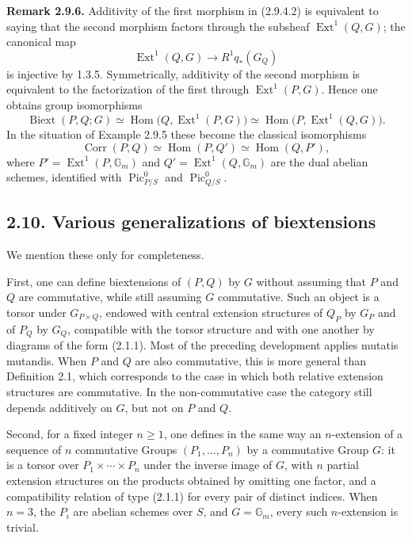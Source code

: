 \documentclass[11pt]{article}
\providecommand{\Pic}{\operatorname{Pic}}
\providecommand{\Ext}{\operatorname{Ext}}
\providecommand{\Biext}{\operatorname{Biext}}
\providecommand{\Corr}{\operatorname{Corr}}
\begin{document}
\textbf{Remark 2.9.6.}  Additivity of the first morphism in (2.9.4.2) is equivalent to saying that the second morphism factors through the subsheaf \(\Ext^1(Q,G)\); the canonical map
\begin{equation}\tag{2.9.6.0}
  \Ext^1(Q,G)\longrightarrow R^1q_*(G_Q)
\end{equation}
is injective by 1.3.5.  Symmetrically, additivity of the second morphism is equivalent to the factorization of the first through \(\Ext^1(P,G)\).  Hence one obtains group isomorphisms
\begin{equation}\tag{2.9.6.1}
  \Biext(P,Q;G)
  \simeq \operatorname{Hom}\bigl(Q,\Ext^1(P,G)\bigr)
  \simeq \operatorname{Hom}\bigl(P,\Ext^1(Q,G)\bigr).
\end{equation}
In the situation of Example 2.9.5 these become the classical isomorphisms
\begin{equation}\tag{2.9.6.2}
  \Corr(P,Q)\simeq \operatorname{Hom}(P,Q')\simeq\operatorname{Hom}(Q,P'),
\end{equation}
where \(P'=\Ext^1(P,\mathbb G_m)\) and \(Q'=\Ext^1(Q,\mathbb G_m)\) are the dual abelian schemes, identified with \(\Pic^0_{P/S}\) and \(\Pic^0_{Q/S}\).

\subsection*{2.10. Various generalizations of biextensions}
We mention these only for completeness.

First, one can define biextensions of \((P,Q)\) by \(G\) without assuming that \(P\) and \(Q\) are commutative, while still assuming \(G\) commutative.  Such an object is a torsor under \(G_{P\times Q}\), endowed with central extension structures of \(Q_P\) by \(G_P\) and of \(P_Q\) by \(G_Q\), compatible with the torsor structure and with one another by diagrams of the form (2.1.1).  Most of the preceding development applies mutatis mutandis.  When \(P\) and \(Q\) are also commutative, this is more general than Definition 2.1, which corresponds to the case in which both relative extension structures are commutative.  In the non-commutative case the category still depends additively on \(G\), but not on \(P\) and \(Q\).

Second, for a fixed integer \(n\geq1\), one defines in the same way an \(n\)-extension of a sequence of \(n\) commutative Groups \((P_1,\ldots,P_n)\) by a commutative Group \(G\): it is a torsor over \(P_1\times\cdots\times P_n\) under the inverse image of \(G\), with \(n\) partial extension structures on the products obtained by omitting one factor, and a compatibility relation of type (2.1.1) for every pair of distinct indices.  When \(n=3\), the \(P_i\) are abelian schemes over \(S\), and \(G=\mathbb G_m\), every such \(n\)-extension is trivial.
\end{document}
